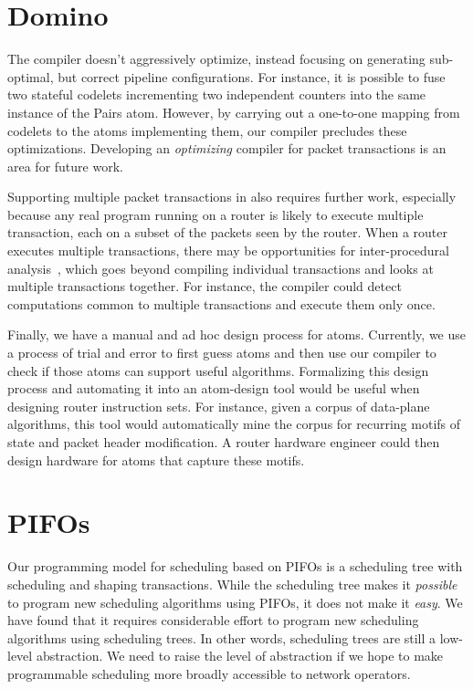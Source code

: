 \section{Domino}
\label{sec:domino_limitations}
The \pktlanguage compiler doesn't aggressively optimize, instead focusing on
generating sub-optimal, but correct pipeline configurations. For instance, it is
possible to fuse two stateful codelets incrementing two independent counters
into the same instance of the Pairs atom. However, by carrying out a one-to-one
mapping from codelets to the atoms implementing them, our compiler precludes
these optimizations.  Developing an {\em optimizing} compiler for packet
transactions is an area for future work.

Supporting multiple packet transactions in \pktlanguage also requires further
work, especially because any real program running on a router is likely to
execute multiple transaction, each on a subset of the packets seen by the
router. When a router executes multiple transactions, there may be
opportunities for inter-procedural analysis~\cite{dragonbook}, which goes
beyond compiling individual transactions and looks at multiple transactions
together.  For instance, the compiler could detect computations common to
multiple transactions and execute them only once.

Finally, we have a manual and ad hoc design process for atoms. Currently, we
use a process of trial and error to first guess atoms and then use our compiler
to check if those atoms can support useful algorithms.  Formalizing this design
process and automating it into an atom-design tool would be useful when
designing router instruction sets. For instance, given a corpus of data-plane
algorithms, this tool would automatically mine the corpus for recurring motifs
of state and packet header modification. A router hardware engineer could then
design hardware for atoms that capture these motifs.

\section{PIFOs}
\label{sec:pifo_limitations}

Our programming model for scheduling based on PIFOs is a scheduling tree with
scheduling and shaping transactions. While the scheduling tree makes it
\textit{possible} to program new scheduling algorithms using PIFOs, it does not
make it \textit{easy}. We have found that it requires considerable effort to
program new scheduling algorithms using scheduling trees.  In other words,
scheduling trees are still a low-level abstraction. We need to raise the level
of abstraction if we hope to make programmable scheduling more broadly
accessible to network operators.

